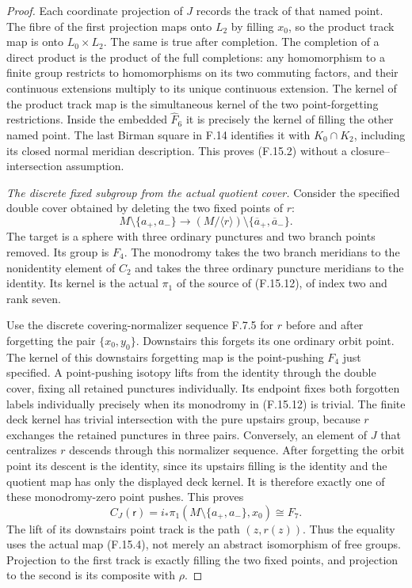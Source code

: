 \begin{proof}
Each coordinate projection of $J$ records the track of
that named point.  The fibre of the first projection
maps onto $L_2$ by filling $x_0$, so the product track
map is onto $L_0\times L_2$.  The same is true after
completion.  The completion of a direct product is the
product of the full completions: any homomorphism to a
finite group restricts to homomorphisms on its two
commuting factors, and their continuous extensions
multiply to its unique continuous extension.
The kernel of the product track map is the simultaneous
kernel of the two point-forgetting restrictions.
Inside the embedded $\widehat F_6$ it is precisely
the kernel of filling the other named point.
The last Birman square in F.14 identifies it with
$K_0\cap K_2$, including its closed normal
meridian description.  This proves (F.15.2) without a
closure--intersection assumption.

\emph{The discrete fixed subgroup from the actual quotient cover.}
Consider the specified double cover obtained by deleting
the two fixed points of $r$:
\[
 M\setminus\{a_+,a_-\}\longrightarrow
   (M/\langle r\rangle)\setminus\{\overline a_+,
                                      \overline a_-\}.
                                                               \tag{F.15.12}
\]
The target is a sphere with three ordinary punctures
and two branch points removed.  Its group is $F_4$.
The monodromy takes the two branch meridians to the
nonidentity element of $C_2$ and takes the three
ordinary puncture meridians to the identity.
Its kernel is the actual $\pi_1$ of the source of
(F.15.12), of index two and rank seven.

Use the discrete covering-normalizer sequence F.7.5
for $r$ before and after forgetting the pair
$\{x_0,y_0\}$.  Downstairs this forgets its one ordinary
orbit point.  The kernel of this downstairs
forgetting map is the point-pushing $F_4$ just
specified.  A point-pushing isotopy lifts from the
identity through the double cover, fixing all retained
punctures individually.  Its endpoint fixes both
forgotten labels individually precisely when its
monodromy in (F.15.12) is trivial.
The finite deck kernel has trivial intersection with
the pure upstairs group, because $r$ exchanges the
retained punctures in three pairs.
Conversely, an element of $J$ that centralizes $r$
descends through this normalizer sequence.  After
forgetting the orbit point its descent is the identity,
since its upstairs filling is the identity and the
quotient map has only the displayed deck kernel.
It is therefore exactly one of these monodromy-zero
point pushes.  This proves
\[
 C_J(\mathsf r)
      =i_*\pi_1(M\setminus\{a_+,a_-\},x_0)
      \cong F_7.                                               \tag{F.15.13}
\]
The lift of its downstairs point track is the path
$(z,r(z))$.  Thus the equality uses the actual map
(F.15.4), not merely an abstract isomorphism of free
groups.  Projection to the first track is exactly
filling the two fixed points, and projection to the
second is its composite with $\rho$.


\end{proof}
